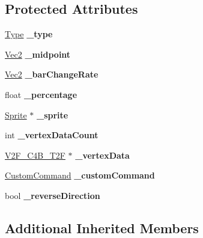\subsection*{Protected Attributes}
\begin{DoxyCompactItemize}
\item 
\mbox{\label{classProgressTimer_ad00405360dfedb86de90d81dea8f9ddd}} 
\hyperlink{classProgressTimer_a9638d092b86d51bce727621b1a70d32f}{Type} {\bfseries \+\_\+type}
\item 
\mbox{\label{classProgressTimer_a14a34a6cab4aa6280011a9593c9d526c}} 
\hyperlink{classVec2}{Vec2} {\bfseries \+\_\+midpoint}
\item 
\mbox{\label{classProgressTimer_ae1094487f63f41b37e6c2306edee41a0}} 
\hyperlink{classVec2}{Vec2} {\bfseries \+\_\+bar\+Change\+Rate}
\item 
\mbox{\label{classProgressTimer_a74de1bcc32a54ceff6811b30be694743}} 
float {\bfseries \+\_\+percentage}
\item 
\mbox{\label{classProgressTimer_af81b1ac91477aceb7ab6c4764558b613}} 
\hyperlink{classSprite}{Sprite} $\ast$ {\bfseries \+\_\+sprite}
\item 
\mbox{\label{classProgressTimer_aea4fa9b9362ee0ef57ae9d4c296cc9ad}} 
int {\bfseries \+\_\+vertex\+Data\+Count}
\item 
\mbox{\label{classProgressTimer_a23486cb5bb30d13b6fd935c672023f5e}} 
\hyperlink{structV2F__C4B__T2F}{V2\+F\+\_\+\+C4\+B\+\_\+\+T2F} $\ast$ {\bfseries \+\_\+vertex\+Data}
\item 
\mbox{\label{classProgressTimer_add15e4ebeecc4a08601dcc8d7a28c6cb}} 
\hyperlink{classCustomCommand}{Custom\+Command} {\bfseries \+\_\+custom\+Command}
\item 
\mbox{\label{classProgressTimer_a60e9d6c0ca4f77a716c23a7ace19893b}} 
bool {\bfseries \+\_\+reverse\+Direction}
\end{DoxyCompactItemize}
\subsection*{Additional Inherited Members}


